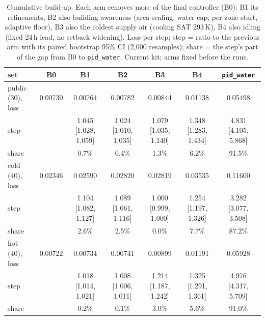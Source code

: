 \begin{table}[!htbp]
\caption{Cumulative build-up. Each arm removes more of the final controller (B0): B1 its refinements, B2 also building awareness (area scaling, water cap, per-zone start, adaptive floor), B3 also the coldest supply air (cooling SAT 293\,K), B4 also idling (fixed 24\,h lead, no setback widening). Loss per step; step = ratio to the previous arm with its paired bootstrap 95\% CI (2,000 resamples); share = the step's part of the gap from B0 to \texttt{pid\_water}. Current kit; arms fixed before the runs.}
\label{tab:buildup}
\centering\scriptsize
\setlength{\tabcolsep}{2.5pt}
\begin{tabular}{lcccccc}
\toprule
set & B0 & B1 & B2 & B3 & B4 & \texttt{pid\_water} \\
\midrule
public (30), loss & 0.00730 & 0.00764 & 0.00782 & 0.00844 & 0.01138 & 0.05498 \\
\quad step & & 1.045 [1.028, 1.059] & 1.024 [1.010, 1.035] & 1.079 [1.035, 1.140] & 1.348 [1.283, 1.434] & 4.831 [4.105, 5.868] \\
\quad share & & 0.7\% & 0.4\% & 1.3\% & 6.2\% & 91.5\% \\
cold (40), loss & 0.02346 & 0.02590 & 0.02820 & 0.02819 & 0.03535 & 0.11600 \\
\quad step & & 1.104 [1.082, 1.127] & 1.089 [1.061, 1.116] & 1.000 [0.999, 1.000] & 1.254 [1.197, 1.326] & 3.282 [3.077, 3.508] \\
\quad share & & 2.6\% & 2.5\% & 0.0\% & 7.7\% & 87.2\% \\
hot (40), loss & 0.00722 & 0.00734 & 0.00741 & 0.00899 & 0.01191 & 0.05928 \\
\quad step & & 1.018 [1.014, 1.021] & 1.008 [1.006, 1.011] & 1.214 [1.187, 1.242] & 1.325 [1.291, 1.361] & 4.976 [4.317, 5.709] \\
\quad share & & 0.2\% & 0.1\% & 3.0\% & 5.6\% & 91.0\% \\
\bottomrule
\end{tabular}
\end{table}

